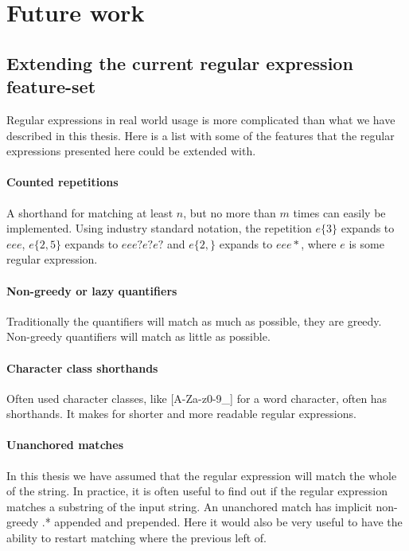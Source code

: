 \section{Future work}


\subsection{Extending the current regular expression feature-set}

Regular expressions in real world usage is more complicated than what
we have described in this thesis. Here is a list with some of the
features that the regular expressions presented here could be extended
with.

\paragraph{Counted repetitions} A shorthand for matching at least $n$, but
no more than $m$ times can easily be implemented. Using industry
standard notation, the repetition $e\{3\}$ expands to $eee$,
$e\{2,5\}$ expands to $eee?e?e?$ and $e\{2,\}$ expands to $eee*$,
where $e$ is some regular expression.

\paragraph{Non-greedy or lazy quantifiers} Traditionally the quantifiers will
match as much as possible, they are greedy. Non-greedy quantifiers
will match as little as possible.

\paragraph{Character class shorthands} Often used character classes,
like \textsf{[A-Za-z0-9\_]} for a word character, often has
shorthands. It makes for shorter and more readable regular
expressions.

\paragraph{Unanchored matches} In this thesis we have assumed that the
regular expression will match the whole of the string. In practice, it
is often useful to find out if the regular expression matches a
substring of the input string. An unanchored match has implicit
non-greedy \textsf{.*} appended and prepended. Here it would also be
very useful to have the ability to restart matching where the previous
left of. 

